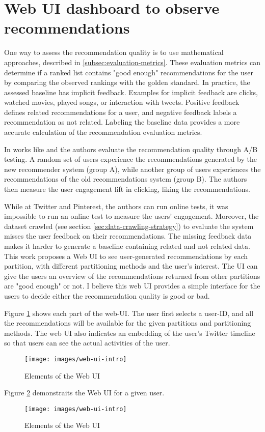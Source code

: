 \section{Web UI dashboard to observe recommendations}
\label{sec:web-ui}
One way to assess the recommendation quality is to use mathematical approaches, described in \ref{subsec:evaluation-metrics}. These evaluation metrics can determine if a ranked list contains "good enough" recommendations for the user by comparing the observed rankings with the golden standard. In practice, the assessed baseline has implicit feedback. Examples for implicit feedback are clicks, watched movies, played songs, or interaction with tweets. Positive feedback defines related recommendations for a user, and negative feedback labels a recommendation as not related. Labeling the baseline data provides a more accurate calculation of the recommendation evaluation metrics.


In works like \cite{eksombatchaiPixieSystemRecommending2018} and \cite{goelWhoToFollowSystemTwitter2015} the authors evaluate the recommendation quality through A/B testing. A random set of users experience the recommendations generated by the new recommender system (group A), while another group of users experiences the recommendations of the old recommendations system (group B). The authors then measure the user engagement lift in clicking, liking the recommendations. 


While at Twitter and Pinterest, the authors can run online tests, it was impossible to run an online test to measure the users' engagement. Moreover, the dataset crawled (see section \ref{sec:data-crawling-strategy}) to evaluate the system misses the user feedback on their recommendations. The missing feedback data makes it harder to generate a baseline containing related and not related data. This work proposes a Web UI to see user-generated recommendations by each partition, with different partitioning methods and the user's interest. The UI can give the users an overview of the recommendations returned from other partitions are "good enough" or not. I believe this web UI provides a simple interface for the users to decide either the recommendation quality is good or bad.


Figure \ref{fig:web-ui-intro} shows each part of the web-UI. The user first selects a user-ID, and all the recommendations will be available for the given partitions and partitioning methods. The web UI also indicates an embedding of the user's Twitter timeline so that users can see the actual activities of the user. 

\begin{figure}[!h]
	\centering
	\texttt{[image: images/web-ui-intro]}
	\caption{Elements of the Web UI}
	\label{fig:web-ui-intro}
\end{figure}

Figure \ref{fig:web-ui-example} demonstraits the Web UI for a given user.

\begin{figure}[!h]
	\centering
	\texttt{[image: images/web-ui-intro]}
	\caption{Elements of the Web UI}
	\label{fig:web-ui-example}
\end{figure}
